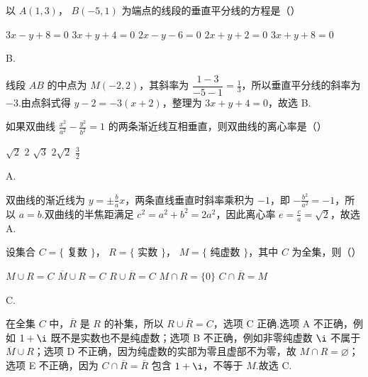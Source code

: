 \begin{problem}

以 \(A(1,3) \)， \(B(-5,1) \) 为端点的线段的垂直平分线的方程是（\quad）

\choicesfive
    {\(3x - y + 8 = 0 \)}
    {\(3x + y + 4 = 0 \)}
    {\(2x - y - 6 = 0\)}
    {\(2x + y + 2 = 0 \)}
    {\(3x + y + 8 = 0 \)}
\end{problem}

\begin{answer}
B.
\end{answer}

\begin{solution}
线段 \(AB\) 的中点为 \(M(-2,2)\)，其斜率为 \(\dfrac{1-3}{-5-1}=\frac13\)，所以垂直平分线的斜率为 \(-3\).由点斜式得 \(y-2=-3(x+2)\)，整理为 \(3x+y+4=0\)，故选 B.
\end{solution}

\begin{problem}

如果双曲线 \(\frac{x^{2}}{a^{2}} - \frac{y^{2}}{b^{2}} = 1 \) 的两条渐近线互相垂直，则双曲线的离心率是（\quad）

\choicesfive
    {\(\sqrt{2} \)}
    {\(2\)}
    {\(\sqrt{3} \)}
    {\(2\sqrt{2} \)}
    {\(\frac{3}{2} \)}
\end{problem}

\begin{answer}
A.
\end{answer}

\begin{solution}
双曲线的渐近线为 \(y=\pm\frac ba x\)，两条直线垂直时斜率乘积为 \(-1\)，即 \(-\frac{b^{2}}{a^{2}}=-1\)，所以 \(a=b\).双曲线的半焦距满足 \(c^{2}=a^{2}+b^{2}=2a^{2}\)，因此离心率 \(e=\frac ca=\sqrt2\)，故选 A.
\end{solution}

\begin{problem}

设集合 \(C = \{ \) 复数 \(\} \)， \(R = \{ \) 实数 \(\} \)， \(M = \{ \) 纯虚数 \(\} \)，其中 \(C\) 为全集，则（\quad）

\choicesfive
    {\(M \cup R = C \)}
    {\(\overline{M} \cup R = C \)}
    {\(R \cup \overline{R} = C \)}
    {\(M \cap R = \{0\} \)}
    {\(C \cap \overline{R} = M \)}
\end{problem}

\begin{answer}
C.
\end{answer}

\begin{solution}
在全集 \(C\) 中，\(\overline{R}\) 是 \(R\) 的补集，所以 \(R\cup\overline{R}=C\)，选项 C 正确.选项 A 不正确，例如 \(1+\i\) 既不是实数也不是纯虚数；选项 B 不正确，例如非零纯虚数 \(\i\) 不属于 \(\overline M\cup R\)；选项 D 不正确，因为纯虚数的实部为零且虚部不为零，故 \(M\cap R=\varnothing\)；选项 E 不正确，因为 \(C\cap\overline R=\overline R\) 包含 \(1+\i\)，不等于 \(M\).故选 C.
\end{solution}

